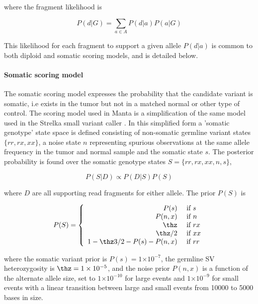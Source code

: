 \documentclass{article}
\newcommand{\e}[1]{\ensuremath{\times 10^{#1}}}
\begin{document}
\noindent
where the fragment likelihood is

\begin{equation*}
P(d \vert G) = \sum_{a \in A} P(d \vert a) P(a|G)
\end{equation*}

This likelihood for each fragment to support a given allele $P(d \vert a)$ is common to both diploid and somatic scoring models, and is detailed below.


\paragraph{Somatic scoring model}

The somatic scoring model expresses the probability that the candidate variant is somatic, i.e exists in the tumor but not in a matched normal or other type of control. The scoring model used in Manta is a simplification of the same model used in the Strelka small variant caller \cite{strelka2012}. In this simplified form a 'somatic genotype' state space is defined consisting of non-somatic germline variant states $\{rr, rx, xx\}$, a noise state $n$ representing spurious observations at the same allele frequency in the tumor and normal sample and the somatic state $s$. The posterior probability is found over the somatic genotype states $S = \{rr,rx,xx,n,s\}$, 

\begin{equation*}
P( S \vert D ) \propto P( D \vert S )  P (S) 
\end{equation*}

\noindent
where $D$ are all supporting read fragments for either allele. The prior $P(S)$ is

\begin{equation*}
P ( S ) =
\left\{
\begin{array}{rl}
P ( s )  & \mbox{ if $s$} \\
P ( n , x )  & \mbox{ if $n$} \\
\thz      & \mbox{ if $rx$} \\
\thz / 2  & \mbox{ if $xx$} \\
1 - \thz 3 / 2 - P(s) - P(n,x)  & \mbox{ if $rr$}
\end{array}
\right.
\end{equation*}

\noindent
where the somatic variant prior is $P(s) = 1\e{-7}$, the germline SV heterozygosity is $\thz = 1\e{-5}$, and the noise prior $P(n,x)$ is a function of the alternate allele size, set to $1\e{-10}$ for large events and $1\e{-9}$ for small events with a linear transition between large and small events from 10000 to 5000 bases in size.
\end{document}
